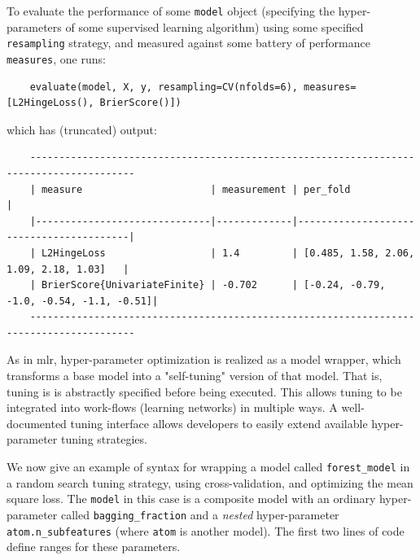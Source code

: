\documentclass{article}
\begin{document}
To evaluate the performance of some \texttt{model} object (specifying
the hyper-parameters of some supervised learning algorithm) using some
specified \texttt{resampling} strategy, and measured against some
battery of performance \texttt{measures}, one runs:

\begin{verbatim}
    evaluate(model, X, y, resampling=CV(nfolds=6), measures=[L2HingeLoss(), BrierScore()])
\end{verbatim}

which has (truncated) output:

\begin{verbatim}
    ----------------------------------------------------------------------------------------
    | measure                      | measurement | per_fold                                |
    |------------------------------|-------------|-----------------------------------------|
    | L2HingeLoss                  | 1.4         | [0.485, 1.58, 2.06, 1.09, 2.18, 1.03]   |
    | BrierScore{UnivariateFinite} | -0.702      | [-0.24, -0.79, -1.0, -0.54, -1.1, -0.51]|
    ----------------------------------------------------------------------------------------
\end{verbatim}


As in mlr, hyper-parameter optimization is realized as a model
wrapper, which transforms a base model into a "self-tuning" version of
that model. That is, tuning is is abstractly specified before being
executed. This allows tuning to be integrated into work-flows
(learning networks) in multiple ways. A well-documented tuning
interface \cite{MLJTuning} allows developers to easily extend
available hyper-parameter tuning strategies.

We now give an example of syntax for wrapping a model called
\texttt{forest\_model} in a random search tuning strategy, using
cross-validation, and optimizing the mean square loss. The
\texttt{model} in this case is a composite model with an ordinary
hyper-parameter called \texttt{bagging\_fraction} and a \textit{nested}
hyper-parameter \texttt{atom.n\_subfeatures} (where \texttt{atom} is
another model). The first two lines of code define ranges for these
parameters.
\end{document}
